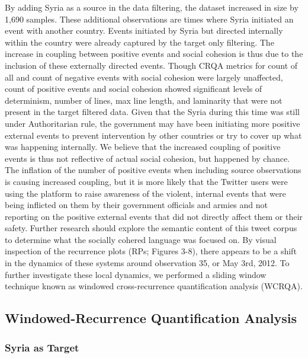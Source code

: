 \documentclass[english,man]{apa6}
\begin{document}
By adding Syria as a source in the data filtering, the dataset increased in size by 1,690 samples. These additional observations are times where Syria initiated an event with another country. Events initiated by Syria but directed internally within the country were already captured by the target only filtering. The increase in coupling between positive events and social cohesion is thus due to the inclusion of these externally directed events. Though CRQA metrics for count of all and count of negative events with social cohesion were largely unaffected, count of positive events and social cohesion showed significant levels of determinism, number of lines, max line length, and laminarity that were not present in the target filtered data. Given that the Syria during this time was still under Authoritarian rule, the government may have been initiating more positive external events to prevent intervention by other countries or try to cover up what was happening internally. We believe that the increased coupling of positive events is thus not reflective of actual social cohesion, but happened by chance. The inflation of the number of positive events when including source observations is causing increased coupling, but it is more likely that the Twitter users were using the platform to raise awareness of the violent, internal events that were being inflicted on them by their government officials and armies and not reporting on the positive external events that did not directly affect them or their safety. Further research should explore the semantic content of this tweet corpus to determine what the socially cohered language was focused on.
By visual inspection of the recurrence plots (RPs; Figures 3-8), there appears to be a shift in the dynamics of these systems around observation 35, or May 3rd, 2012. To further investigate these local dynamics, we performed a sliding window technique known as windowed cross-recurrence quantification analysis (WCRQA).

\hypertarget{windowed-recurrence-quantification-analysis}{%
\subsection{Windowed-Recurrence Quantification Analysis}\label{windowed-recurrence-quantification-analysis}}

\hypertarget{syria-as-target-3}{%
\subsubsection{Syria as Target}\label{syria-as-target-3}}
\end{document}
